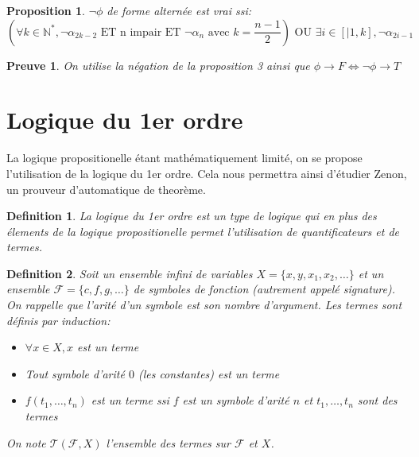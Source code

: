 \documentclass{paper}
\newtheorem{prop}{Proposition}
\newtheorem{defi}{Definition}
\newtheorem{preuve}{Preuve}
\begin{document}
\begin{prop}
    $\lnot\phi$ de forme alternée est vrai ssi:
    $$(\forall k\in\mathbb{N}^*, \lnot\alpha_{2k-2} \text{ ET n impair ET } \lnot\alpha_n \text{ avec } k=\frac{n-1}{2}) \text{ OU } \exists i\in [|1,k], \lnot\alpha_{2i-1}$$
\end{prop}

\begin{preuve}
    On utilise la négation de la proposition 3 ainsi que $\phi \rightarrow F \Leftrightarrow \lnot\phi \rightarrow T$  
\end{preuve}



























\section{Logique du 1er ordre}
La logique propositionelle étant mathématiquement limité, on se propose l'utilisation de la logique du 1er ordre.
Cela nous permettra ainsi d'étudier Zenon, un prouveur d'automatique de theorème.
\begin{defi}
    La \textit{logique du 1er ordre} est un type de logique qui en plus des élements de la logique propositionelle permet l'utilisation de
    quantificateurs et de \textit{termes}.
\end{defi}

\begin{defi}
    Soit un ensemble infini de variables $X = \{x,y,x_1,x_2,\dots \}$ et un ensemble $\mathcal{F}=\{c,f,g,\dots \}$ de symboles de fonction (autrement appelé signature).
    On rappelle que l'arité d'un symbole est son nombre d'argument.
    Les termes sont définis par induction:
    \begin{itemize}
        \item $\forall x\in X, x$ est un terme
        \item Tout symbole d'arité $0$ (les constantes) est un terme
        \item $f(t_1,\dots,t_n)$ est un terme ssi $f$ est un symbole d'arité $n$ et $t_1,\dots,t_n$ sont des termes
    \end{itemize} 
    On note $\mathcal{T}(\mathcal{F}, X)$ l'ensemble des termes sur $\mathcal{F}$ et $X$.
\end{defi}
\end{document}
